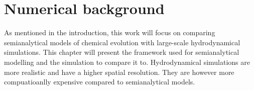 \chapter{Numerical background}
\label{sec:numerical-background}

As mentioned in the introduction, this work will focus on comparing semianalytical models of chemical evolution with large-scale hydrodynamical simulations.
This chapter will present the framework used for semianalytical modelling and the simulation to compare it to.
Hydrodynamical simulations are more realistic and have a higher spatial resolution. They are however more compuatioanlly expensive compared to semianalytical models.

\setlength{\figwidth}{0.8\linewidth}



